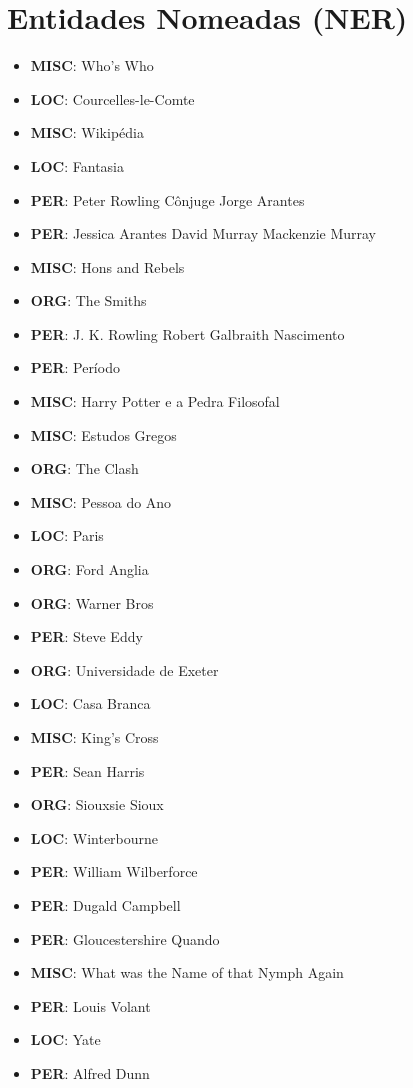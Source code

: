 \documentclass{article}
\begin{document}
\section{Entidades Nomeadas (NER)}
\begin{itemize}
\item \textbf{MISC}: Who's Who
\item \textbf{LOC}: Courcelles-le-Comte
\item \textbf{MISC}: Wikipédia
\item \textbf{LOC}: Fantasia
\item \textbf{PER}: Peter Rowling Cônjuge Jorge Arantes
\item \textbf{PER}: Jessica Arantes David Murray Mackenzie Murray
\item \textbf{MISC}: Hons and Rebels
\item \textbf{ORG}: The Smiths
\item \textbf{PER}: J. K. Rowling Robert Galbraith Nascimento
\item \textbf{PER}: Período
\item \textbf{MISC}: Harry Potter e a Pedra Filosofal
\item \textbf{MISC}: Estudos Gregos
\item \textbf{ORG}: The Clash
\item \textbf{MISC}: Pessoa do Ano
\item \textbf{LOC}: Paris
\item \textbf{ORG}: Ford Anglia
\item \textbf{ORG}: Warner Bros
\item \textbf{PER}: Steve Eddy
\item \textbf{ORG}: Universidade de Exeter
\item \textbf{LOC}: Casa Branca
\item \textbf{MISC}: King's Cross
\item \textbf{PER}: Sean Harris
\item \textbf{ORG}: Siouxsie Sioux
\item \textbf{LOC}: Winterbourne
\item \textbf{PER}: William Wilberforce
\item \textbf{PER}: Dugald Campbell
\item \textbf{PER}: Gloucestershire Quando
\item \textbf{MISC}: What was the Name of that Nymph Again
\item \textbf{PER}: Louis Volant
\item \textbf{LOC}: Yate
\item \textbf{PER}: Alfred Dunn

\end{itemize}
\end{document}
